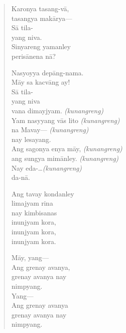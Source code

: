 \documentclass[12pt,paper=a4]{scrartcl}
\begin{document}
\begin{quote}
\begin{multicols}{2}
Karonya tasang-vā,\\
tasangya makārya---\\
Sā tila-\\
yang niva.\\
Sinyareng yamanley\\
perisānena nā?

Nasyoyya depāng-nama.\\
Māy sa kacvāng ay!\\
Sā tila-\\
yang niva\\
vana dimayjyam.			\tab \textit{(kunangreng)}\\
Yam nasyyang vās lito	\tab \textit{(kunangreng)}\\
na Mavay---				\tab \textit{(kunangreng)}\\
nay lesayang.\\
Ang sagonya enya māy,	\tab \textit{(kunangreng)}\\
ang sungya mimānley.	\tab \textit{(kunangreng)}\\
Nay eda-\dots			\tab \textit{(kunangreng)}\\
da-nā.

\columnbreak

Ang tavay kondanley\\
limajyam rina\\
nay kimbisanas\\
inunjyam kora,\\
inunjyam kora,\\
inunjyam kora.

Māy, yang---\\
Ang grenay avanya,\\
grenay avanya nay\\
nimpyang.\\
Yang---\\
Ang grenay avanya\\
grenay avanya nay\\
nimpyang.
\end{multicols}



\end{quote}
\end{document}
